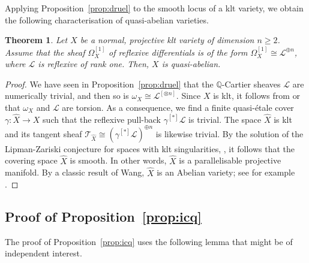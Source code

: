 \documentclass[JEP,XML,SOM,Unicode,published]{cedram}
\let\scr\mathscr
\theoremstyle{plain}
\newtheorem{thm}{Theorem}[section]
\theoremstyle{definition}
\numberwithin{equation}{thm}
\numberwithin{enumi}{thm}
\newcommand{\sL}{\scr{L}}
\newcommand{\sT}{\scr{T}}
\newcommand{\bQ}{\mathbb{Q}}
\let\what\widehat
\begin{document}
Applying Proposition~\ref{prop:druel} to the smooth locus of a klt variety, we
obtain the following characterisation of quasi-abelian varieties.

\begin{thm}\label{thm:druel}
Let $X$ be a normal, projective klt variety of dimension $n \geq 2$. Assume that
the sheaf $\Omega^{[1]}_X$ of reflexive differentials is of the form
$\Omega^{[1]}_X \cong \sL^{\oplus n}$, where $\sL$ is reflexive of rank one. Then, $X$ is
quasi-abelian.
\end{thm}
\begin{proof}
We have seen in Proposition~\ref{prop:druel} that the $\bQ$-Cartier sheaves $\sL$
are numerically trivial, and then so is $\omega_X \cong \sL^{[\otimes n]}$. Since $X$ is klt,
it follows from \cite[Prop.\,V.4.9]{Nakayama04} or \cite[Th.\,4.2]{MR2134273}
that $\omega_X$ and $\sL$ are torsion. As a consequence, we find a finite
quasi-étale cover $\gamma: \what{X} \to X$ such that the reflexive pull-back
$\gamma^{[*]} \sL$ is trivial. The space $\what{X}$ is klt and its tangent sheaf
$\sT_{\what{X}} \cong \left(\gamma^{[*]} \sL \right)^{\oplus n}$ is likewise trivial. By the
solution of the Lipman-Zariski conjecture for spaces with klt singularities,
\cite[Th.\,6]{GKKP11}, it follows that the covering space $\what{X}$ is
smooth. In other words, $\what{X}$ is a parallelisable projective manifold.
By a classic result of Wang, $\what{X}$ is an Abelian variety; see for example
\cite[\S 3.9, Lem.\,1]{MR1334091}.
\end{proof}

\subsection{Proof of Proposition~\ref*{prop:icq}}
\label{ssec:popicq}

The proof of Proposition~\ref{prop:icq} uses the following lemma that might be
of independent interest.
\end{document}
